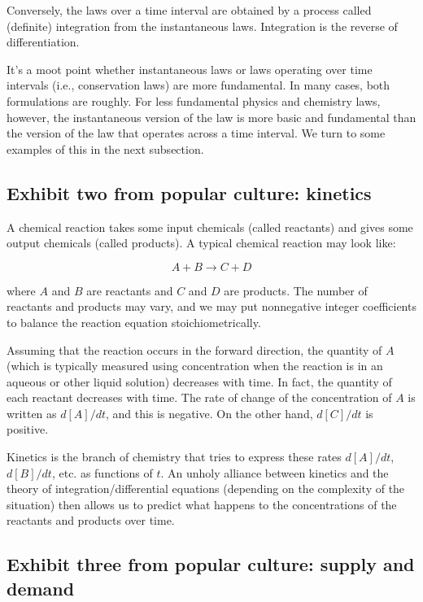 Conversely, the laws over a time interval are obtained by a process
called (definite) integration from the instantaneous laws. Integration
is the reverse of differentiation.

It's a moot point whether instantaneous laws or laws operating over
time intervals (i.e., conservation laws) are more fundamental. In many
cases, both formulations are roughly. For less fundamental physics and
chemistry laws, however, the instantaneous version of the law is more
basic and fundamental than the version of the law that operates across
a time interval. We turn to some examples of this in the next
subsection.

\subsection{Exhibit two from popular culture: kinetics}

A chemical reaction takes some input chemicals (called reactants) and
gives some output chemicals (called products). A typical chemical
reaction may look like:

$$A + B \to C + D$$

where $A$ and $B$ are reactants and $C$ and $D$ are products. The
number of reactants and products may vary, and we may put nonnegative
integer coefficients to balance the reaction equation stoichiometrically.

Assuming that the reaction occurs in the forward direction, the
quantity of $A$ (which is typically measured using concentration when
the reaction is in an aqueous or other liquid solution) decreases with
time. In fact, the quantity of each reactant decreases with time. The
rate of change of the concentration of $A$ is written as $d[A]/dt$,
and this is negative. On the other hand, $d[C]/dt$ is positive.

Kinetics is the branch of chemistry that tries to express these rates
$d[A]/dt$, $d[B]/dt$, etc. as functions of $t$. An unholy alliance
between kinetics and the theory of integration/differential equations
(depending on the complexity of the situation) then allows us to
predict what happens to the concentrations of the reactants and
products over time.

\subsection{Exhibit three from popular culture: supply and demand}
